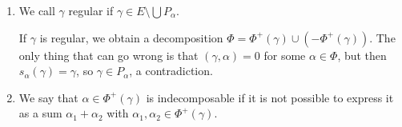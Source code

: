 \begin{enumerate}[label=(\alph*)]
	\item We call $\gamma$ regular if $\gamma \in E\setminus\bigcup P_\alpha$.

		If $\gamma$ is regular, we obtain a decomposition $\Phi = \Phi^+(\gamma) \cup (-\Phi^+(\gamma))$.
		The only thing that can go wrong is that $(\gamma, \alpha) = 0$ for some
		$\alpha \in \Phi$, but then $s_\alpha(\gamma) = \gamma$, so  $\gamma \in P_\alpha$,
		a contradiction.

	\item We say that $\alpha \in \Phi^+(\gamma)$ is indecomposable if
		it is not possible to express it as a sum $\alpha_1 + \alpha_2$ with
		$\alpha_1, \alpha_2 \in \Phi^+(\gamma)$.
\end{enumerate}
